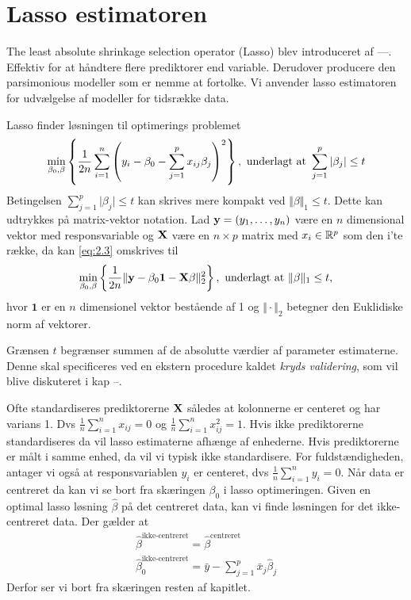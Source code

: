 \section{Lasso estimatoren}
The least absolute shrinkage selection operator (Lasso) blev introduceret af ---. 
Effektiv for at håndtere flere prediktorer end variable.
Derudover producere den parsimonious modeller som er nemme at fortolke.
Vi anvender lasso estimatoren for udvælgelse af modeller for tidsrække data.

Lasso finder løsningen til optimerings problemet
\begin{align}
\min_{\beta_0, \beta} \cbr{\frac{1}{2n} \sum_{i=1}^n \del{y_i - \beta_0 - \sum_{j=1}^p x_{ij} \beta_j}^2}, \ \text{underlagt at } \sum_{j=1}^p \vert \beta_j \vert \leq t \label{eq:2.3}
\end{align}
Betingelsen $\sum_{j=1}^p \vert \beta_j \vert \leq t$ kan skrives mere kompakt ved $\Vert \beta \Vert_1 \leq t$.
Dette kan udtrykkes på matrix-vektor notation.
Lad \(\mathbf{y}=(y_1, \ldots, y_n)\) være en \(n\) dimensional vektor med responsvariable og \(\mathbf{X}\) være en $n \times p$ matrix med $x_i \in \mathbb{R}^p$ som den i'te række, da kan \eqref{eq:2.3} omskrives til
\begin{align*}
\min_{\beta_0, \beta} \cbr{\frac{1}{2n} \Vert \y - \beta_0 \mathbf{1} - \X \beta \Vert_2^2}, \ \text{underlagt at } \Vert \beta \Vert_1 \leq t,
\end{align*}
hvor \(\mathbf{1}\) er en \(n\) dimensionel vektor bestående af 1 og \(\Vert \cdot \Vert_2\) betegner den Euklidiske norm af vektorer.

Grænsen \(t\) begrænser summen af de absolutte værdier af parameter estimaterne.
Denne skal specificeres ved en ekstern procedure kaldet \textit{kryds validering}, som vil blive diskuteret i kap --.

Ofte standardiseres prediktorerne \(\mathbf{X}\) således at kolonnerne er centeret og har varians 1. Dvs \(\frac{1}{n} \sum_{i=1}^n x_{ij} = 0\) og \(\frac{1}{n} \sum_{i=1}^n x_{ij}^2=1\). Hvis ikke prediktorerne standardiseres da vil lasso estimaterne afhænge af enhederne.
Hvis prediktorerne er målt i samme enhed, da vil vi typisk ikke standardisere.
For fuldstændigheden, antager vi også at responsvariablen $y_i$ er centeret, dvs \(\frac{1}{n} \sum_{i=1}^n y_{i} = 0\).
Når data er centreret da kan vi se bort fra skæringen $\beta_0$ i lasso optimeringen.
Given en optimal lasso løsning \(\hat{\beta}\) på det centreret data, kan vi finde løsningen for det ikke-centreret data. Der gælder at
\begin{align*}
\hat{\beta}^{\text{ikke-centreret}} = \hat{\beta}^{\text{centreret}} \\
\hat{\beta}_0^{\text{ikke-centreret}} = \bar{y} - \sum_{j=1}^p \bar{x}_j \hat{\beta}_j
\end{align*}
Derfor ser vi bort fra skæringen resten af kapitlet.

